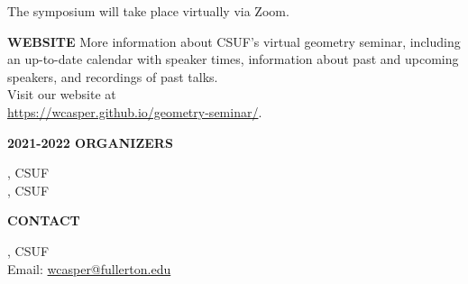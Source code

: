 \documentclass[a4paper]{article}
\begin{document}
\begin{minipage}{0.95\textwidth}
\begin{minipage}[b]{0.47\textwidth}
The symposium will take place virtually via Zoom.

\medskip

\large{\color{csecondary}\textbf{WEBSITE}}
More information about CSUF's virtual geometry seminar, including an up-to-date calendar with speaker times, information about past and upcoming speakers, and recordings of past talks.\\
Visit our website at\\ \href{https://wcasper.github.io/geometry-seminar/}{https://wcasper.github.io/geometry-seminar/}.

\medskip
\textbf{\color{csecondary}\large 2021-2022 ORGANIZERS}\par
{}, CSUF\\
, CSUF

\medskip

\textbf{\color{csecondary}\large CONTACT }\par

, CSUF\\
Email: \href{mailto:wcasper@fullerton.edu}{wcasper@fullerton.edu}

\rule{0pt}{78pt}
\end{minipage}
\vspace*{-70pt}

\end{minipage}
\end{document}
